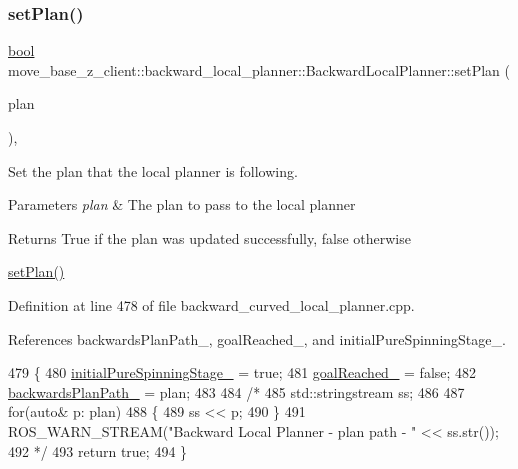 \subsubsection{\texorpdfstring{set\+Plan()}{setPlan()}}
{\footnotesize\ttfamily \hyperlink{classbool}{bool} move\+\_\+base\+\_\+z\+\_\+client\+::backward\+\_\+local\+\_\+planner\+::\+Backward\+Local\+Planner\+::set\+Plan (\begin{DoxyParamCaption}\item[{const std\+::vector$<$ geometry\+\_\+msgs\+::\+Pose\+Stamped $>$ \&}]{plan }\end{DoxyParamCaption})\hspace{0.3cm}{\ttfamily [override]}, {\ttfamily [virtual]}}



Set the plan that the local planner is following. 


\begin{DoxyParams}{Parameters}
{\em plan} & The plan to pass to the local planner \\
\hline
\end{DoxyParams}
\begin{DoxyReturn}{Returns}
True if the plan was updated successfully, false otherwise
\end{DoxyReturn}
\hyperlink{classmove__base__z__client_1_1backward__local__planner_1_1BackwardLocalPlanner_a3b552c90996d21cadf7b2f0875706407}{set\+Plan()} 

Definition at line 478 of file backward\+\_\+curved\+\_\+local\+\_\+planner.\+cpp.



References backwards\+Plan\+Path\+\_\+, goal\+Reached\+\_\+, and initial\+Pure\+Spinning\+Stage\+\_\+.


\begin{DoxyCode}
479 \{
480     \hyperlink{classmove__base__z__client_1_1backward__local__planner_1_1BackwardLocalPlanner_a5db5b10d8cdf425321ee6ec932f594ae}{initialPureSpinningStage\_} = \textcolor{keyword}{true};
481     \hyperlink{classmove__base__z__client_1_1backward__local__planner_1_1BackwardLocalPlanner_a0a89141d3d3a8ebfb9e1d69d0d33fd49}{goalReached\_} = \textcolor{keyword}{false};
482     \hyperlink{classmove__base__z__client_1_1backward__local__planner_1_1BackwardLocalPlanner_a451add2af7d6d83a7415277311b3ed04}{backwardsPlanPath\_} = plan;
483 
484     \textcolor{comment}{/*}
485 \textcolor{comment}{    std::stringstream ss;}
486 \textcolor{comment}{}
487 \textcolor{comment}{    for(auto& p: plan)}
488 \textcolor{comment}{    \{}
489 \textcolor{comment}{        ss << p;}
490 \textcolor{comment}{    \}}
491 \textcolor{comment}{    ROS\_WARN\_STREAM("Backward Local Planner - plan path - " << ss.str());}
492 \textcolor{comment}{    */}
493     \textcolor{keywordflow}{return} \textcolor{keyword}{true};
494 \}
\end{DoxyCode}


